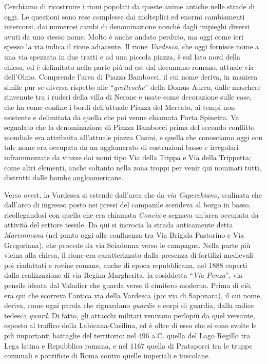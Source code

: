 \documentclass[
  letterpaper,
  DIV=11,
  numbers=noendperiod]{scrartcl}
\begin{document}
Cerchiamo di ricostruire i rioni popolati da queste anime antiche nelle
strade di oggi. Le questioni sono rese complesse dai molteplici ed
enormi cambiamenti intercorsi, dai numerosi cambi di denominazione
nonché dagli impieghi diversi avuti da uno stesso nome. Molto è anche
andato perduto, ma oggi come ieri spesso la via indica il rione
adiacente. Il rione \emph{Vardesca}, che oggi fornisce nome a una via
spezzata in due tratti e ad una piccola piazza, è sul lato nord della
chiesa, ed è delimitato nella parte più ad est dal decumano romano,
attuale via dell'Olmo. Comprende l'area di Piazza Bambocci, il cui nome
deriva, in maniera simile pur se diversa rispetto alle
``\emph{grottesche}'' della Domus Aurea, dalle maschere rinvenute tra i
ruderi della villa di Nerone e usate come decorazione sulle case, che ha
come confine i bordi dell'attuale Piazza del Mercato, ai tempi non
esistente e delimitata da quella che poi venne chiamata Porta Spinetta.
Va segnalato che la denominazione di Piazza Bambocci prima del secondo
conflitto mondiale era attribuita all'attuale piazza Casini, e quella
che conosciamo oggi con tale nome era occupata da un agglomerato di
costruzioni basse e irregolari inframmezzate da viuzze dai nomi tipo Via
della Trippa e Via della Trippetta; come altri elementi, anche soltanto
nella zona troppi per venir qui nominati tutti, distrutti dalle
\href{2016-09-07-8-settembre-frascati-tuscolo-comandini.html}{bombe
angloamericane}.

Verso ovest, la Vardesca si estende dall'area che da \emph{via
Caperchiano}, scalinata che dall'arco di ingresso posto nei pressi del
campanile scendeva al borgo in basso, ricollegandosi con quella che era
chiamata \emph{Concia} e segnava un'area occupata da attività del
settore tessile. Da qui si incrocia la strada anticamente detta
\emph{Maremmana} (nel punto oggi alla confluenza tra Via Brigida
Pastorino e Via Gregoriana), che procede da via Sciadonna verso le
campagne. Nella parte più vicina alla chiesa, il rione era
caratterizzato dalla presenza di fortilizi medievali poi riadattati e
rovine romane, anche di epoca repubblicana, nel 1888 coperti dalla
realizzazione di via Regina Margherita, la cosiddetta ``\emph{Via
Penza}'', via pensile ideata dal Valadier che guarda verso il cimitero
moderno. Prima di ciò, era qui che scorreva l'antica via della Vardesca
(poi via di Saponara), il cui nome deriva, come ogni parola che
riguardano \emph{guardie} e corpi di guardia, dalla radice tedesca
\emph{qward}. Di fatto, gli attacchi militari venivano perlopiù da quel
versante, esposto al traffico della Labicana-Casilina, ed è oltre di
esso che si sono svolte le più importanti battaglie del territorio: nel
496 a.C. quella del Lago Regillo tra Lega latina e Repubblica romana, e
nel 1167 quella di Prataporci tra le truppe comunali e pontificie di
Roma contro quelle imperiali e tuscolane.
\end{document}
